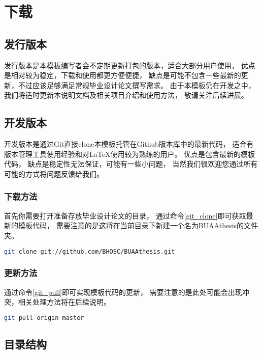 \chapter{下载}

\section{发行版本}

发行版本是本模板编写者会不定期更新打包的版本，适合大部分用户使用，
优点是相对较为稳定，下载和使用都更方便便捷，
缺点是可能不包含一些最新的更新，不过应该足够满足常规毕业设计论文撰写需求。
由于本模板仍在开发之中，我们将适时更新本说明文档及相关项目介绍和使用方法，
敬请关注后续进展。

\section{开发版本}

开发版本是通过Git直接clone本模板托管在Github版本库中的最新代码，
适合有版本管理工具使用经验和对LaTeX使用较为熟练的用户。
优点是包含最新的模板代码，
缺点是稳定性无法保证，可能有一些小问题，
当然我们很欢迎您通过所有可能的方式将问题反馈给我们。

\subsection{下载方法}
首先你需要打开准备存放毕业设计论文的目录，
通过命令\ref{git_clone}即可获取最新的模板代码，
需要注意的是这将在当前目录下新建一个名为BUAAthesis的文件夹。
\begin{lstlisting}[language=bash,label=git_clone,caption={git clone}]
    git clone git://github.com/BHOSC/BUAAthesis.git
\end{lstlisting}

\subsection{更新方法}
通过命令\ref{git_pull}即可实现模板代码的更新，
需要注意的是此处可能会出现冲突，相关处理方法将在后续说明。
\begin{lstlisting}[language=bash,label=git_pull,caption={git pull}]
    git pull origin master
\end{lstlisting}

\section{目录结构}

